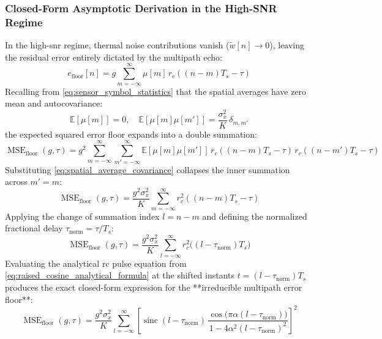 \documentclass[Markos_Delaportas_1316.tex]{subfiles}
\begin{document}
\subsubsection{Closed-Form Asymptotic Derivation in the High-SNR Regime}
\label{subsubsec:closed_form_floor}
In the high-\gls{snr} regime, thermal noise contributions vanish
($\tilde{w}[n] \to 0$), leaving the residual error
entirely dictated by the multipath echo:
\begin{equation}
    e_{\text{floor}}[n] = g \sum_{m=-\infty}^{\infty} \mu[m] \,
    r_c((n-m)T_s - \tau)
    \label{eq:floor_error_definition}
\end{equation}
Recalling from \cref{eq:sensor_symbol_statistics} that the spatial
averages have zero mean and autocovariance:
\begin{equation}
    \mathbb{E}[\mu[m]] = 0, \quad \mathbb{E}[\mu[m]\mu[m']] =
    \frac{\sigma_x^2}{K} \, \delta_{m,m'}
    \label{eq:spatial_average_covariance}
\end{equation}
the expected squared error floor expands into a double summation:
\begin{equation}
    \operatorname{MSE}_{\text{floor}}(g, \tau) = g^2
    \sum_{m=-\infty}^{\infty} \sum_{m'=-\infty}^{\infty}
    \mathbb{E}[\mu[m]\mu[m']] \, r_c((n-m)T_s - \tau) \, r_c((n-m')T_s - \tau)
    \label{eq:floor_double_sum}
\end{equation}
Substituting \cref{eq:spatial_average_covariance} collapses the inner
summation across $m' = m$:
\begin{equation}
    \operatorname{MSE}_{\text{floor}}(g, \tau) = \frac{g^2
    \sigma_x^2}{K} \sum_{m=-\infty}^{\infty} r_c^2((n-m)T_s - \tau)
    \label{eq:floor_single_sum_m}
\end{equation}
Applying the change of summation index $l = n - m$ and defining the
normalized fractional delay $\tau_{\text{norm}} = \tau / T_s$:
\begin{equation}
    \operatorname{MSE}_{\text{floor}}(g, \tau) = \frac{g^2
    \sigma_x^2}{K} \sum_{l=-\infty}^{\infty} r_c^2\big((l -
    \tau_{\text{norm}}) T_s\big)
    \label{eq:floor_index_l}
\end{equation}
Evaluating the analytical \gls{rc} pulse equation from
\cref{eq:raised_cosine_analytical_formula} at the shifted instants
$t = (l - \tau_{\text{norm}}) T_s$ produces the exact closed-form
expression for the **irreducible multipath error floor**:
\begin{equation}
    \boxed{\operatorname{MSE}_{\text{floor}}(g, \tau) = \frac{g^2
        \sigma_x^2}{K} \sum_{l=-\infty}^{\infty} \left[
            \operatorname{sinc}(l - \tau_{\text{norm}}) \, \frac{\cos\big(\pi
            \alpha (l - \tau_{\text{norm}})\big)}{1 - 4 \alpha^2 (l -
    \tau_{\text{norm}})^2} \right]^2}
    \label{eq:closed_form_error_floor}
\end{equation}
\end{document}
